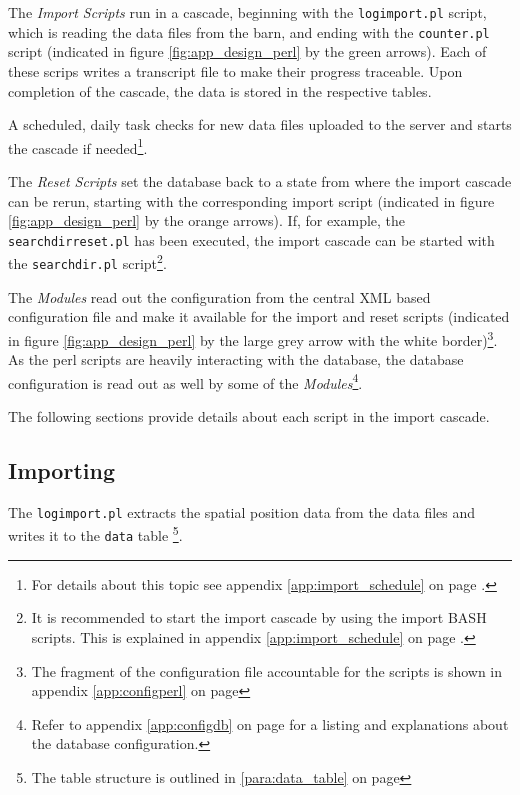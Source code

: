 The \textit{Import Scripts} run in a cascade, beginning with the \lstinline|logimport.pl| script, which is reading the data files from the barn, and ending with the \lstinline|counter.pl| script (indicated in figure \ref{fig:app_design_perl} by the green arrows). Each of these scrips writes a transcript file to make their progress traceable. Upon completion of the cascade, the data is stored in the respective tables.

A scheduled, daily task checks for new data files uploaded to the server and starts the cascade if needed\footnote{For details about this topic see appendix \ref{app:import_schedule} on page \pageref{app:import_schedule}.}.

The \textit{Reset Scripts} set the database back to a state from where the import cascade can be rerun,  starting with the corresponding import script (indicated in figure \ref{fig:app_design_perl} by the orange arrows). If, for example, the \lstinline|searchdirreset.pl| has been executed, the import cascade can be started with the \lstinline|searchdir.pl| script\footnote{It is recommended to start the import cascade by using the import BASH scripts. This is explained in appendix \ref{app:import_schedule} on page \pageref{app:import_schedule}.}.

The \textit{Modules} read out the configuration from the central \ac{XML} based configuration file and make it available for the import and reset scripts (indicated in figure \ref{fig:app_design_perl} by the large grey arrow with the white border)\footnote{The fragment of the configuration file accountable for the scripts is shown in appendix \ref{app:configperl} on page \pageref{app:configperl}}. As the perl scripts are heavily interacting with the database, the database configuration is read out as well by some of the \textit{Modules}\footnote{Refer to appendix \ref{app:configdb} on page \pageref{app:configdb} for a listing and explanations about the database configuration.}. 

The following sections provide details about each script in the import cascade.

\subsection{Importing}
\label{subsec:importing}

The \lstinline|logimport.pl| extracts the spatial position data from the data files and writes it to the \lstinline|data| table \footnote{The table structure is outlined in \ref{para:data_table} on page \pageref{para:data_table}}.

